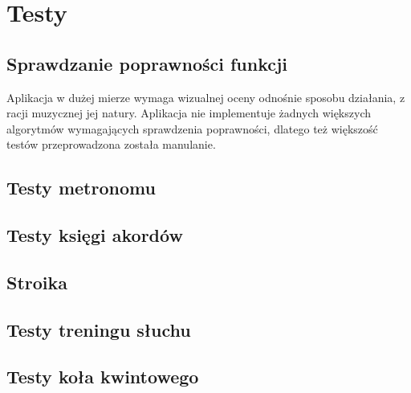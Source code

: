 \chapter{Testy}

\section{Sprawdzanie poprawności funkcji}

Aplikacja w dużej mierze wymaga wizualnej oceny odnośnie sposobu działania, z racji muzycznej jej natury. Aplikacja nie implementuje żadnych większych algorytmów wymagających sprawdzenia poprawności, dlatego też większość testów przeprowadzona została manulanie.

\section{Testy metronomu}

\section{Testy księgi akordów}

\section{Stroika}

\section{Testy treningu słuchu}

\section{Testy koła kwintowego}